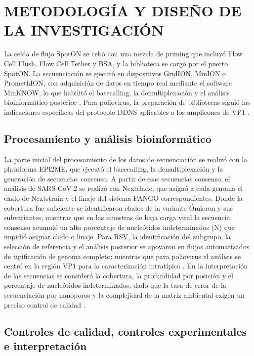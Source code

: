 \section{METODOLOGÍA Y DISEÑO DE LA INVESTIGACIÓN}

La celda de flujo SpotON se cebó con una mezcla de priming que incluyó Flow Cell Flush, Flow Cell Tether y BSA, y la biblioteca se cargó por el puerto SpotON. La secuenciación se ejecutó en dispositivos GridION, MinION o PromethION, con adquisición de datos en tiempo real mediante el software MinKNOW, lo que habilitó el basecalling, la demultiplexación y el análisis bioinformático posterior \cite{ONT_2025,Dash_2024}. Para poliovirus, la preparación de bibliotecas siguió las indicaciones específicas del protocolo DDNS aplicables a los amplicones de VP1 \cite{Shaw_2020,Shaw_2022_protocol}.

\subsection{Procesamiento y análisis bioinformático}

La parte inicial del procesamiento de los datos de secuenciación se realizó con la plataforma EPI2ME, que ejecutó el basecalling, la demultiplexación y la generación de secuencias consenso. A partir de esas secuencias consenso, el análisis de SARS-CoV-2 se realizó con Nextclade, que asignó a cada genoma el clado de Nextstrain y el linaje del sistema PANGO correspondientes. Donde la cobertura fue suficiente se identificaron clados de la variante Ómicron y sus subvariantes, mientras que en las muestras de baja carga viral la secuencia consenso acumuló un alto porcentaje de nucleótidos indeterminados (N) que impidió asignar clado o linaje. Para RSV, la identificación del subgrupo, la selección de referencia y el análisis posterior se apoyaron en flujos automatizados de tipificación de genoma completo; mientras que para poliovirus el análisis se centró en la región VP1 para la caracterización intratípica \cite{Le_2025,Shaw_2020}. En la interpretación de las secuencias se consideró la cobertura, la profundidad por posición y el porcentaje de nucleótidos indeterminados, dado que la tasa de error de la secuenciación por nanoporos y la complejidad de la matriz ambiental exigen un preciso control de calidad \cite{Dash_2024,Child_2023}.

\subsection{Controles de calidad, controles experimentales e interpretación}

